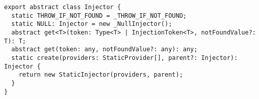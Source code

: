 \begin{verbatim}
export abstract class Injector {
  static THROW_IF_NOT_FOUND = _THROW_IF_NOT_FOUND;
  static NULL: Injector = new _NullInjector();
  abstract get<T>(token: Type<T> | InjectionToken<T>, notFoundValue?: T): T;
  abstract get(token: any, notFoundValue?: any): any;
  static create(providers: StaticProvider[], parent?: Injector): Injector {
    return new StaticInjector(providers, parent);
  }
}
\end{verbatim}
